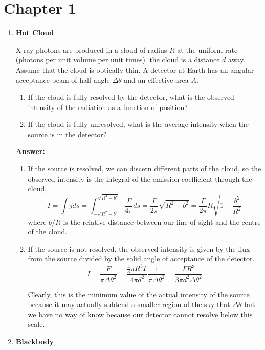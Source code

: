 \documentclass{article}
\begin{document}
\fi
\section{Chapter 1}

\begin{enumerate}
\item{\bf Hot Cloud}

X-ray photons are produced in a cloud of radius $R$ at the uniform rate
 (photons per unit volume per unit times). the cloud is a distance $d$
away. Assume that the cloud is optically thin. A detector at Earth has
an angular acceptance beam of half-angle $\Delta \theta$ and an effective area $A$.
\begin{enumerate}
\item If the cloud is fully resolved by the detector, what is the observed 
      intensity of the radiation as a function of position?
\item If the cloud is fully unresolved, what is the average intensity when 
      the source is in the detector?
\end{enumerate}
{\bf Answer:}    
\begin{enumerate}
\item If the source is resolved, we can discern different parts of the cloud, so the observed intensity is the integral of the emission coefficient through the cloud,
\begin{equation}
I = \int j ds = \int_{-\sqrt{R^2-b^2}}^{\sqrt{R^2-b^2}} \frac{\Gamma}{4\pi}  ds = \frac{\Gamma}{2\pi} \sqrt{R^2-b^2} = \frac{\Gamma}{2\pi} R \sqrt{1-\frac{b^2}{R^2}}
\end{equation}
where $b/R$ is the relative distance between our line of sight and the centre of the cloud.
\item If the source is not resolved, the observed intensity is given by the flux from the source divided by the solid angle of acceptance of the detector.
\begin{equation}
I = \frac{F}{\pi \Delta \theta^2} = \frac{\frac{4}{3} \pi R^3 \Gamma  }{4\pi d^2} \frac{1}{\pi \Delta \theta^2} = \frac{\Gamma R^3}{3 \pi d^2 \Delta \theta^2}
\end{equation}

Clearly, this is the minimum value of the actual intensity of the
source because it may actually subtend a smaller region of the sky
that $\Delta \theta$ but we have no way of know because our detector
cannot resolve below this scale.
\end{enumerate}
\setcounter{enumi}{2}
\item{\bf Blackbody}


\end{enumerate}
\end{document}
